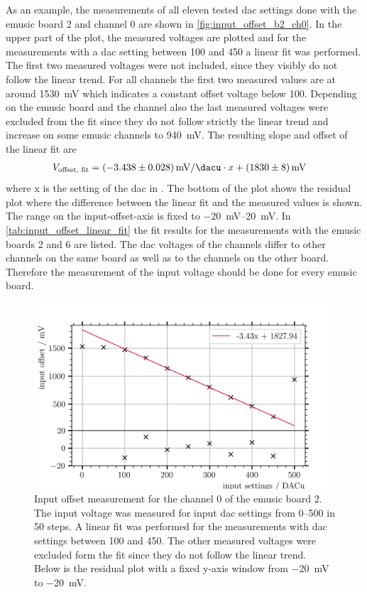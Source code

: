 As an example, the measurements of all eleven tested \ac{dac} settings done with the \ac{emusic} board 2 and channel 0 are shown in \autoref{fig:input_offset_b2_ch0}.
In the upper part of the plot, the measured voltages are plotted and for the measurements with a \ac{dac} setting between \SI{100}{\dacu} and \SI{450}{\dacu} a linear fit was performed.
The first two measured voltages were not included, since they visibly do not follow the linear trend.
For all channels the first two measured values are at around \SI{1530}{\milli\volt} which indicates a constant offset voltage below \SI{100}{\adcu}.
Depending on the \ac{emusic} board and the channel also the last measured voltages were excluded from the fit since they do not follow strictly the linear trend and increase on some \ac{emusic} channels to \SI{940}{\milli\volt}.
The resulting slope and offset of the linear fit are
\begin{align}
    V_\text{offset, fit} &= \SI{-3.438(28)}{\milli\volt\per\dacu}\cdot x+\SI{1830(8)}{\milli\volt}
\end{align}
where x is the setting of the \ac{dac} in \si{\dacu}.
The bottom of the plot shows the residual plot where the difference between the linear fit and the measured values is shown.
The range on the input-offset-axis is fixed to \SIrange{-20}{20}{\milli\volt}.
In \autoref{tab:input_offset_linear_fit} the fit results for the measurements with the \ac{emusic} boards 2 and 6 are listed.
The \ac{dac} voltages of the channels differ to other channels on the same board as well as to the channels on the other board.
Therefore the measurement of the input voltage should be done for every \ac{emusic} board.
\begin{figure}
	\centering
	\includegraphics[width=1.\textwidth]{pictures/input_offset_board_2_channel_0}
	\caption[Input offset measurement for eMUSIC board 2 channel 1]{Input offset measurement for the channel 0 of the \ac{emusic} board 2. The input voltage was measured for input \ac{dac} settings from \SIrange{0}{500}{\dacu} in \SI{50}{\dacu} steps. A linear fit was performed for the measurements with \ac{dac} settings between \SI{100}{\dacu} and \SI{450}{\dacu}. The other measured voltages were excluded form the fit since they do not follow the linear trend. Below is the residual plot with a fixed y-axis window from \SI{-20}{\milli\volt} to \SI{-20}{\milli\volt}.}
	\label{fig:input_offset_b2_ch0}
\end{figure}
